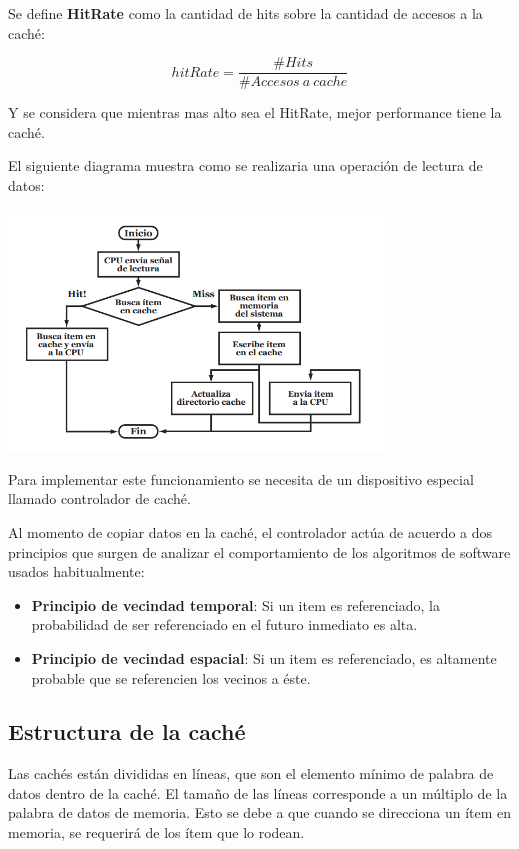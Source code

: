 Se define \textbf{HitRate} como la cantidad de hits sobre la cantidad de accesos a la caché:

$$hitRate = \frac{\#Hits}{\#Accesos~a~cache}$$

Y se considera que mientras mas alto sea el HitRate, mejor performance tiene la caché.

El siguiente diagrama muestra como se realizaria una operación de lectura de datos:

\begin{center}
	\includegraphics[width=10cm, keepaspectratio=yes]{imagenes/cache.PNG}
\end{center}


Para implementar este funcionamiento se necesita de un dispositivo especial llamado controlador de caché.

Al momento de copiar datos en la caché, el controlador actúa de acuerdo a dos principios que surgen de analizar el comportamiento de los algoritmos de software usados habitualmente:
\begin{itemize}
	\item\textbf{Principio de vecindad temporal}: Si un item es referenciado, la probabilidad de ser referenciado en el futuro inmediato es alta.
	\item\textbf{Principio de vecindad espacial}: Si un item es referenciado, es altamente probable que se referencien los vecinos a éste.
\end{itemize}
\subsection{Estructura de la caché}
Las cachés están divididas en líneas, que son el elemento mínimo de palabra de datos dentro de la caché. El tamaño de las líneas corresponde a un múltiplo de la palabra de datos de memoria. Esto se debe a que cuando se direcciona un ítem en memoria, se requerirá de los ítem que lo rodean.

